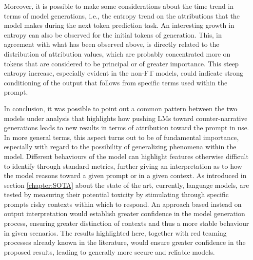Moreover, it is possible to make some considerations about the time trend in terms of model generations, i.e., the entropy trend on the attributions that the model makes during the next token prediction task. An interesting growth in entropy can also be observed for the initial tokens of generation. This, in agreement with what has been observed above, is directly related to the distribution of attribution values, which are probably concentrated more on tokens that are considered to be principal or of greater importance. This steep entropy increase, especially evident in the non-FT models, could indicate strong conditioning of the output that follows from specific terms used within the prompt.

In conclusion, it was possible to point out a common pattern between the two models under analysis that highlights how pushing LMs toward counter-narrative generations leads to new results in terms of attribution toward the prompt in use. In more general terms, this aspect turns out to be of fundamental importance, especially with regard to the possibility of generalizing phenomena within the model. Different behaviours of the model can highlight features otherwise difficult to identify through standard metrics, further giving an interpretation as to how the model reasons toward a given prompt or in a given context. As introduced in section \ref{chapter:SOTA} about the state of the art, currently, language models, are tested by measuring their potential toxicity by stimulating through specific prompts risky contexts within which to respond. An approach based instead on output interpretation would establish greater confidence in the model generation process, ensuring greater distinction of contexts and thus a more stable behaviour in given scenarios. The results highlighted here, together with red teaming processes already known in the literature, would ensure greater confidence in the proposed results, leading to generally more secure and reliable models.







